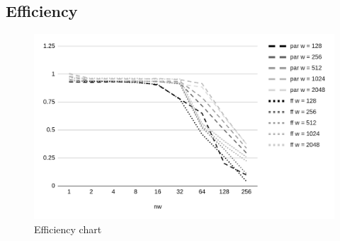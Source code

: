 \subsection{Efficiency}
\begin{figure}[H]
    \centering
    \includegraphics[width=\linewidth]{assets/efficiency}
    \bigskip
    \caption{Efficiency chart}
    \label{fig:efficiency}
\end{figure}